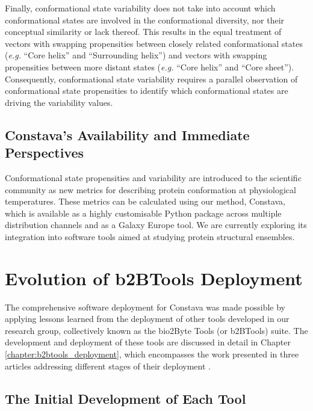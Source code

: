 Finally, conformational state variability does not take into account which conformational states are involved in the conformational diversity, nor their conceptual similarity or lack thereof. This results in the equal treatment of vectors with swapping propensities between closely related conformational states (\textit{e.g.} ``Core helix'' and ``Surrounding helix'') and vectors with swapping propensities between more distant states (\textit{e.g.} ``Core helix'' and ``Core sheet''). Consequently, conformational state variability requires a parallel observation of conformational state propensities to identify which conformational states are driving the variability values.


\subsection{Constava's Availability and Immediate Perspectives}

Conformational state propensities and variability are introduced to the scientific community as new metrics for describing protein conformation at physiological temperatures. These metrics can be calculated using our method, Constava, which is available as a highly customisable Python package across multiple distribution channels and as a Galaxy Europe tool. We are currently exploring its integration into software tools aimed at studying protein structural ensembles.


\section{Evolution of b2BTools Deployment}

The comprehensive software deployment for Constava was made possible by applying lessons learned from the deployment of other tools developed in our research group, collectively known as the bio2Byte Tools (or b2BTools) suite. The development and deployment of these tools are discussed in detail in Chapter \ref{chapter:b2btools_deployment}, which encompasses the work presented in three articles addressing different stages of their deployment \cite{kagami_online_2021, kagami_b2btools_2021, gavalda-garcia_bio2byte_2024}. 


\subsection{The Initial Development of Each Tool}

